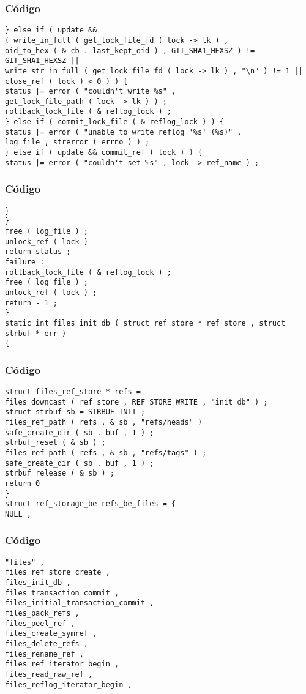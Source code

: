 \documentclass{beamer}
\begin{document}
\begin{frame}[fragile]
\frametitle{C\'odigo}
\begin{verbatim}
} else if ( update && 
( write_in_full ( get_lock_file_fd ( lock -> lk ) , 
oid_to_hex ( & cb . last_kept_oid ) , GIT_SHA1_HEXSZ ) != GIT_SHA1_HEXSZ || 
write_str_in_full ( get_lock_file_fd ( lock -> lk ) , "\n" ) != 1 || 
close_ref ( lock ) < 0 ) ) { 
status |= error ( "couldn't write %s" , 
get_lock_file_path ( lock -> lk ) ) ; 
rollback_lock_file ( & reflog_lock ) ; 
} else if ( commit_lock_file ( & reflog_lock ) ) { 
status |= error ( "unable to write reflog '%s' (%s)" , 
log_file , strerror ( errno ) ) ; 
} else if ( update && commit_ref ( lock ) ) { 
status |= error ( "couldn't set %s" , lock -> ref_name ) ; 
\end{verbatim}
\end{frame}
\begin{frame}[fragile]
\frametitle{C\'odigo}
\begin{verbatim}
} 
} 
free ( log_file ) ; 
unlock_ref ( lock ) 
return status ; 
failure : 
rollback_lock_file ( & reflog_lock ) ; 
free ( log_file ) ; 
unlock_ref ( lock ) ; 
return - 1 ; 
} 
static int files_init_db ( struct ref_store * ref_store , struct strbuf * err ) 
{ 
\end{verbatim}
\end{frame}
\begin{frame}[fragile]
\frametitle{C\'odigo}
\begin{verbatim}
struct files_ref_store * refs = 
files_downcast ( ref_store , REF_STORE_WRITE , "init_db" ) ; 
struct strbuf sb = STRBUF_INIT ; 
files_ref_path ( refs , & sb , "refs/heads" ) 
safe_create_dir ( sb . buf , 1 ) ; 
strbuf_reset ( & sb ) ; 
files_ref_path ( refs , & sb , "refs/tags" ) ; 
safe_create_dir ( sb . buf , 1 ) ; 
strbuf_release ( & sb ) ; 
return 0 
} 
struct ref_storage_be refs_be_files = { 
NULL , 
\end{verbatim}
\end{frame}
\begin{frame}[fragile]
\frametitle{C\'odigo}
\begin{verbatim}
"files" , 
files_ref_store_create , 
files_init_db , 
files_transaction_commit , 
files_initial_transaction_commit , 
files_pack_refs , 
files_peel_ref , 
files_create_symref , 
files_delete_refs , 
files_rename_ref , 
files_ref_iterator_begin , 
files_read_raw_ref , 
files_reflog_iterator_begin , 
\end{verbatim}
\end{frame}
\end{document}
